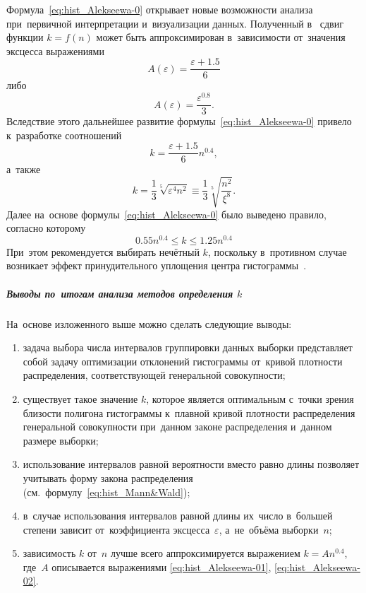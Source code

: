 \documentclass[]{scrartcl}
\begin{document}
Формула~\ref{eq:hist_Alekseewa-0} открывает новые возможности анализа при~первичной интерпретации и~визуализации данных. Полученный в~\cite{Alekseewa:k-hist} сдвиг функции $k = f(n)$ может быть аппроксимирован в~зависимости от~значения эксцесса выражениями
\begin{equation}\label{eq:hist_Alekseewa-01}
A(\varepsilon) = \frac{\varepsilon + 1.5}{6}
\end{equation}
либо
\begin{equation}\label{eq:hist_Alekseewa-02}
A(\varepsilon) = \frac{\varepsilon^{0.8}}{3}.
\end{equation}
Вследствие этого дальнейшее развитие формулы~\ref{eq:hist_Alekseewa-0} привело к~разработке соотношений
\begin{equation}\label{eq:hist_Alekseewa-1}
k = \frac{\varepsilon+1.5}{6} n^{0.4},
\end{equation}
а~также
\begin{equation}\label{eq:hist_Alekseewa-2}
k = \frac{1}{3}\sqrt[5]{\varepsilon^4 n^2} \equiv \frac{1}{3} \sqrt[5]{\frac{n^2}{\xi^8}}.
\end{equation}
Далее на~основе формулы~\ref{eq:hist_Alekseewa-0} было выведено правило, согласно которому
\begin{equation}\label{eq:hist-Alekseewa_3}
0.55n^{0.4} \leq k \leq 1.25n^{0.4}
\end{equation}
При~этом рекомендуется выбирать нечётный $k$, поскольку в~противном случае возникает эффект принудительного уплощения центра гистограммы~\cite{Nowiczkij:oczenka-pogresh}.

\subparagraph{Выводы по~итогам анализа методов определения $k$}
На~основе изложенного выше можно сделать следующие выводы:
	\begin{enumerate}
		\item задача выбора числа интервалов группировки данных выборки представляет собой задачу оптимизации отклонений гистограммы от~кривой плотности распределения, соответствующей генеральной совокупности;
		\item существует такое значение $k$, которое является оптимальным с~точки зрения близости полигона гистограммы к~плавной кривой плотности распределения генеральной совокупности при~данном законе распределения и~данном размере выборки;
		\item использование интервалов равной вероятности вместо равно длины позволяет учитывать форму закона распределения (см.~формулу~\ref{eq:hist_Mann&Wald});
		\item в~случае использования интервалов равной длины их~число в~большей степени зависит от~коэффициента эксцесса~$\varepsilon$, а~не~объёма выборки~$n$;
		\item зависимость $k$ от~$n$ лучше всего аппроксимируется выражением $k=A n^{0.4}$, где~$A$ описывается выражениями \ref{eq:hist_Alekseewa-01}, \ref{eq:hist_Alekseewa-02}.
	\end{enumerate}
\end{document}

